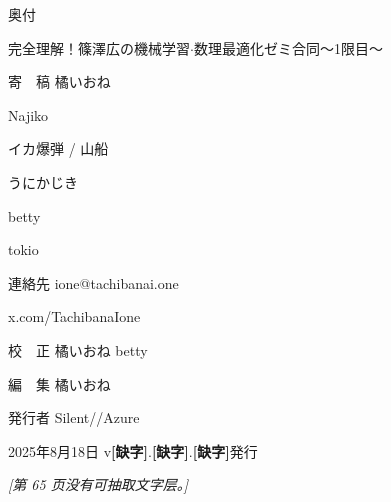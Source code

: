 奥付\par
完全理解！篠澤広の機械学習$\cdot$数理最適化ゼミ合同～1限目～\par
寄　稿 橘いおね\par
Najiko\par
イカ爆弾 / 山船\par
うにかじき\par
betty\par
tokio\par
連絡先 ione@tachibanai.one\par
x.com/TachibanaIone\par
校　正 橘いおね betty\par
編　集 橘いおね\par
発行者 Silent//Azure\par
2025年8月18日 v\textbf{[缺字]}.\textbf{[缺字]}.\textbf{[缺字]}発行\par

\noindent\textit{[第 65 页没有可抽取文字层。]}\par
\endgroup
